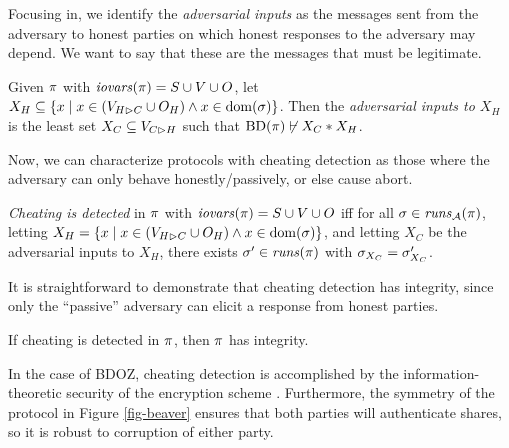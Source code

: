 Focusing in, we identify the \emph{adversarial inputs} as the messages
sent from the adversary to honest parties on which honest responses
to the adversary may depend. We want to say that these are the messages
that must be legitimate.
\begin{definition}
  Given $\pi$ with $\mathit{iovars}(\pi) = S \cup V \cup O$,
  let $X_H \subseteq \{ x \mid x \in (V_{H \rhd C} \cup O_H) \wedge x \in \mathrm{dom}(\sigma) \}$.
  Then the \emph{adversarial inputs to $X_H$} is the least set
  $X_C \subseteq V_{C \rhd H}$ such that $\mathrm{BD}(\pi) \not\vdash X_C * X_H$.
\end{definition}
Now, we can characterize protocols with cheating detection as those where
the adversary can only behave honestly/passively, or else cause abort.
\begin{definition}
  \emph{Cheating is detected} in $\pi$ with $\mathit{iovars}(\pi) = S \cup V \cup O$ iff
  for all  $\sigma \in \mathit{runs}_{\mathcal{A}}(\pi)$,
  letting $X_H = \{ x \mid x \in (V_{H \rhd C} \cup O_H) \wedge x \in \mathrm{dom}(\sigma) \}$,
  and letting $X_C$ be the adversarial inputs to $X_H$,
  there exists $\sigma'\in \mathit{runs}(\pi)$
  with $\sigma_{X_C} = \sigma'_{X_C}$.  
\end{definition}

It is straightforward to demonstrate that cheating detection has integrity,
since only the ``passive'' adversary can elicit a response from honest parties. 
\begin{lemma}
  \label{lemma-cheating}
  If cheating is detected in $\pi$, then $\pi$ has integrity.
\end{lemma}

In the case of BDOZ, cheating detection is accomplished by the information-theoretic
security of the encryption scheme \cite{evans2018pragmatic}. Furthermore, the symmetry of
the protocol in Figure \ref{fig-beaver} ensures that both parties will authenticate
shares, so it is robust to corruption of either party. 
